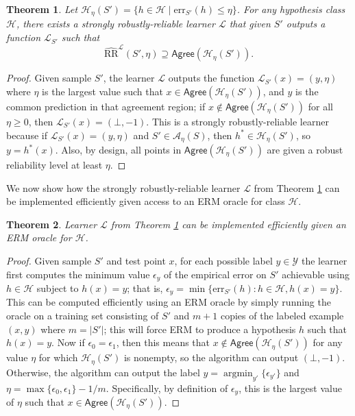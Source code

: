 \documentclass[11pt]{article}
\newcommand{\ECR}{\widehat{\text{RR}}}
\newcommand{\err}{\mathrm{err}}
\newtheorem{theorem}{Theorem}[section]
\newcommand{\0}{\mathbf{0}}
\newcommand{\1}{\mathbf{1}}
\newcommand{\cA}{\mathcal{A}}
\newcommand{\cH}{\mathcal{H}}
\newcommand{\cL}{\mathcal{L}}
\newcommand{\cY}{\mathcal{Y}}
\newcommand{\Agree}{\mathsf{Agree}}
\DeclareMathOperator*{\argmin}{argmin}
\begin{document}
\begin{theorem}\label{thm:empirical-ub}
{Let $\cH_\eta(S')=\{h \in \cH\mid \err_{S'}(h)\le\eta\}$.} For any hypothesis class $\cH$, there exists a strongly robustly-reliable learner $\cL$ that given $S'$ outputs a function $\cL_{S'}$ such that $$\ECR^{\cL}(S',\eta) \supseteq \Agree(\cH_\eta(S')).$$
\end{theorem}
\begin{proof}
Given sample $S'$, the learner $\cL$ outputs the function $\cL_{S'}(x) =(y,\eta)$ where $\eta$ is the largest value such that $x \in \Agree(\cH_{\eta}(S'))$, and $y$ is the common prediction in that agreement region; if  $x \not\in \Agree(\cH_{\eta}(S'))$ for all $\eta\geq 0$, then $\cL_{S'}(x) =(\bot,-1)$. This is a strongly robustly-reliable learner because if $\cL_{S'}(x) =(y,\eta)$ and $S' \in \cA_\eta(S)$, then $h^* \in \cH_\eta(S')$, so $y=h^*(x)$. Also,
by design, all points in $\Agree(\cH_\eta(S'))$ are given a robust reliability level at least $\eta$.
\end{proof}

We now show how the strongly robustly-reliable learner $\cL$ from Theorem \ref{thm:empirical-ub} can be implemented efficiently given access to an ERM oracle for class $\cH$.






\begin{theorem}
Learner $\cL$ from Theorem \ref{thm:empirical-ub} can be implemented efficiently given an ERM oracle for $\cH$.
\label{thm:erm}
\end{theorem}

\begin{proof}
Given sample $S'$ and test point $x$, for each possible label $y \in \cY$ the learner first computes the minimum value $\epsilon_y$ of the empirical error on $S'$ achievable using $h \in \cH$ subject to $h(x)=y$; that is, $\epsilon_y = \min \{\err_{S'}(h) :  h \in \cH, h(x)=y\}$.  This can be computed efficiently using an ERM oracle by simply running the oracle on a training set consisting of $S'$ and $m+1$ copies of the labeled example $(x,y)$ where $m=|S'|$; this will force ERM to produce a hypothesis $h$ such that $h(x)=y$. Now if $\epsilon_0=\epsilon_1$, then this means that  $x \not\in \Agree(\cH_{\eta}(S'))$ for any value $\eta$ for which $\cH_{\eta}(S')$ is nonempty, so the algorithm can output $(\bot,-1)$.  Otherwise, the algorithm can output the label $y = \argmin_{y'} \{\epsilon_{y'}\}$ and $\eta = \max\{\epsilon_0,\epsilon_1\} - 1/m$.  Specifically, by definition of $\epsilon_y$, this is the largest value of $\eta$ such that $x \in \Agree(\cH_{\eta}(S'))$.
\end{proof}
\end{document}
